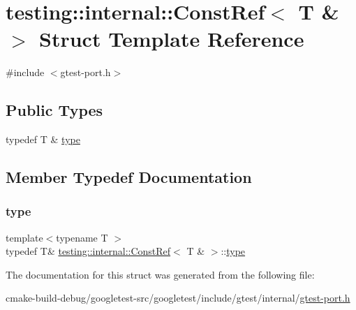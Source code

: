 \hypertarget{structtesting_1_1internal_1_1ConstRef_3_01T_01_6_01_4}{}\section{testing\+::internal\+::Const\+Ref$<$ T \& $>$ Struct Template Reference}
\label{structtesting_1_1internal_1_1ConstRef_3_01T_01_6_01_4}


{\ttfamily \#include $<$gtest-\/port.\+h$>$}

\subsection*{Public Types}
\begin{DoxyCompactItemize}
\item 
typedef T \& \mbox{\hyperlink{structtesting_1_1internal_1_1ConstRef_3_01T_01_6_01_4_a9f664dd25649a0d260cfb1f610c7a349}{type}}
\end{DoxyCompactItemize}


\subsection{Member Typedef Documentation}
\mbox{\label{structtesting_1_1internal_1_1ConstRef_3_01T_01_6_01_4_a9f664dd25649a0d260cfb1f610c7a349}} 
\subsubsection{\texorpdfstring{type}{type}}
{\footnotesize\ttfamily template$<$typename T $>$ \\
typedef T\& \mbox{\hyperlink{structtesting_1_1internal_1_1ConstRef}{testing\+::internal\+::\+Const\+Ref}}$<$ T \& $>$\+::\mbox{\hyperlink{structtesting_1_1internal_1_1ConstRef_3_01T_01_6_01_4_a9f664dd25649a0d260cfb1f610c7a349}{type}}}



The documentation for this struct was generated from the following file\+:\begin{DoxyCompactItemize}
\item 
cmake-\/build-\/debug/googletest-\/src/googletest/include/gtest/internal/\mbox{\hyperlink{gtest-port_8h}{gtest-\/port.\+h}}\end{DoxyCompactItemize}
